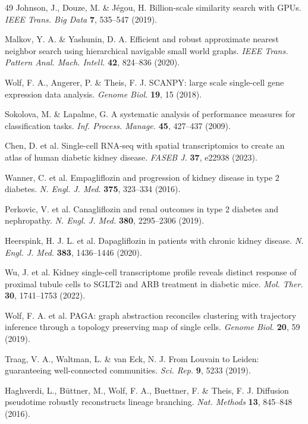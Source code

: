 \documentclass[11pt]{article}
\begin{document}
\begin{thebibliography}{49}
Johnson, J., Douze, M. \& J\'egou, H. Billion-scale similarity search with GPUs. \textit{IEEE Trans. Big Data} \textbf{7}, 535--547 (2019).

Malkov, Y. A. \& Yashunin, D. A. Efficient and robust approximate nearest neighbor search using hierarchical navigable small world graphs. \textit{IEEE Trans. Pattern Anal. Mach. Intell.} \textbf{42}, 824--836 (2020).

Wolf, F. A., Angerer, P. \& Theis, F. J. SCANPY: large scale single-cell gene expression data analysis. \textit{Genome Biol.} \textbf{19}, 15 (2018).

Sokolova, M. \& Lapalme, G. A systematic analysis of performance measures for classification tasks. \textit{Inf. Process. Manage.} \textbf{45}, 427--437 (2009).

Chen, D. et al. Single-cell RNA-seq with spatial transcriptomics to create an atlas of human diabetic kidney disease. \textit{FASEB J.} \textbf{37}, e22938 (2023).

Wanner, C. et al. Empagliflozin and progression of kidney disease in type 2 diabetes. \textit{N. Engl. J. Med.} \textbf{375}, 323--334 (2016).

Perkovic, V. et al. Canagliflozin and renal outcomes in type 2 diabetes and nephropathy. \textit{N. Engl. J. Med.} \textbf{380}, 2295--2306 (2019).

Heerspink, H. J. L. et al. Dapagliflozin in patients with chronic kidney disease. \textit{N. Engl. J. Med.} \textbf{383}, 1436--1446 (2020).

Wu, J. et al. Kidney single-cell transcriptome profile reveals distinct response of proximal tubule cells to SGLT2i and ARB treatment in diabetic mice. \textit{Mol. Ther.} \textbf{30}, 1741--1753 (2022).

Wolf, F. A. et al. PAGA: graph abstraction reconciles clustering with trajectory inference through a topology preserving map of single cells. \textit{Genome Biol.} \textbf{20}, 59 (2019).

Traag, V. A., Waltman, L. \& van Eck, N. J. From Louvain to Leiden: guaranteeing well-connected communities. \textit{Sci. Rep.} \textbf{9}, 5233 (2019).

Haghverdi, L., B\"uttner, M., Wolf, F. A., Buettner, F. \& Theis, F. J. Diffusion pseudotime robustly reconstructs lineage branching. \textit{Nat. Methods} \textbf{13}, 845--848 (2016).


\end{thebibliography}
\end{document}
